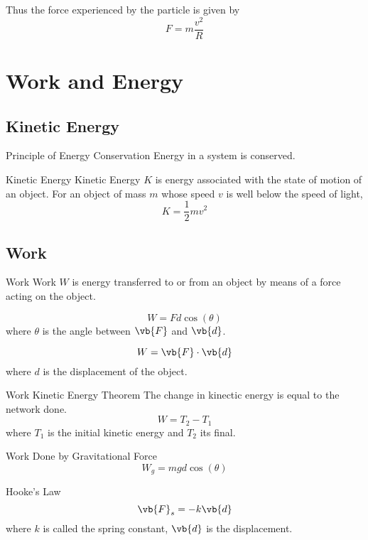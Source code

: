 \documentclass[a4paper]{article}
\begin{document}
\begin{thm}{}{} Thus the force experienced by the particle is given by $$F=m\frac{v^2}{R}$$
\end{thm}

\pagebreak
\section{Work and Energy}
\subsection{Kinetic Energy}
\begin{axm}{Principle of Energy Conservation}{} Energy in a system is conserved. 
\end{axm}

\begin{defn}{Kinetic Energy}{} Kinetic Energy $K$ is energy associated with the state of motion of an object. For an object of mass $m$ whose speed $v$ is well below the speed of light, $$K=\frac{1}{2}mv^2$$
\end{defn}

\subsection{Work}
\begin{defn}{Work}{} Work $W$ is energy transferred to or from an object by means of a force acting on the object. 
\end{defn}

\begin{thm}{}{} $$W=Fd\cos(\theta)$$ where $\theta$ is the angle between $\vb{F}$ and $\vb{d}$. 
\end{thm}

\begin{defn}{}{}$$W=\vb{F}\cdot\vb{d}$$ where $d$ is the displacement of the object. 
\end{defn}

\begin{thm}{Work Kinetic Energy Theorem}{} The change in kinectic energy is equal to the network done. $$W=T_2-T_1$$ where $T_1$ is the initial kinetic energy and $T_2$ its final. 
\end{thm}

\begin{thm}{Work Done by Gravitational Force}{} $$W_g=mgd\cos(\theta)$$
\end{thm}

\begin{thm}{Hooke's Law}{} $$\vb{F}_s=-k\vb{d}$$ where $k$ is called the spring constant, $\vb{d}$ is the displacement. 
\end{thm}
\end{document}
